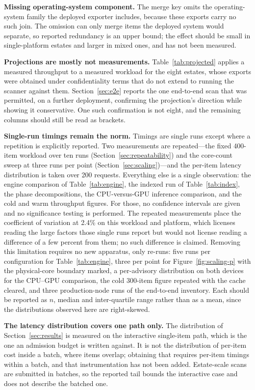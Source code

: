 \documentclass[fleqn,10pt,lineno]{wlpeerj}
\begin{document}
\textbf{Missing operating-system component.} The merge key omits the operating-system family the deployed exporter includes, because these exports carry no such join. The omission can only merge items the deployed system would separate, so reported redundancy is an upper bound; the effect should be small in single-platform estates and larger in mixed ones, and has not been measured.

\textbf{Projections are mostly not measurements.} Table~\ref{tab:projected} applies a measured throughput to a measured workload for the eight estates, whose exports were obtained under confidentiality terms that do not extend to running the scanner against them. Section~\ref{sec:e2e} reports the one end-to-end scan that was permitted, on a further deployment, confirming the projection's direction while showing it conservative. One such confirmation is not eight, and the remaining columns should still be read as brackets.

\textbf{Single-run timings remain the norm.} Timings are single runs except where a repetition is explicitly reported. Two measurements are repeated---the fixed 400-item workload over ten runs (Section~\ref{sec:repeatability}) and the core-count sweep at three runs per point (Section~\ref{sec:scaling})---and the per-item latency distribution is taken over 200 requests. Everything else is a single observation: the engine comparison of Table~\ref{tab:engine}, the indexed run of Table~\ref{tab:index}, the phase decompositions, the CPU-versus-GPU inference comparison, and the cold and warm throughput figures. For those, no confidence intervals are given and no significance testing is performed. The repeated measurements place the coefficient of variation at 2.4\% on this workload and platform, which licenses reading the large factors those single runs report but would not license reading a difference of a few percent from them; no such difference is claimed. Removing this limitation requires no new apparatus, only re-runs: five runs per configuration for Table~\ref{tab:engine}, three per point for Figure~\ref{fig:scaling-p} with the physical-core boundary marked, a per-advisory distribution on both devices for the CPU--GPU comparison, the cold 300-item figure repeated with the cache cleared, and three production-node runs of the end-to-end inventory. Each should be reported as $n$, median and inter-quartile range rather than as a mean, since the distributions observed here are right-skewed.

\textbf{The latency distribution covers one path only.} The distribution of Section~\ref{sec:results} is measured on the interactive single-item path, which is the one an admission budget is written against. It is not the distribution of per-item cost inside a batch, where items overlap; obtaining that requires per-item timings within a batch, and that instrumentation has not been added. Estate-scale scans are submitted in batches, so the reported tail bounds the interactive case and does not describe the batched one.
\end{document}
